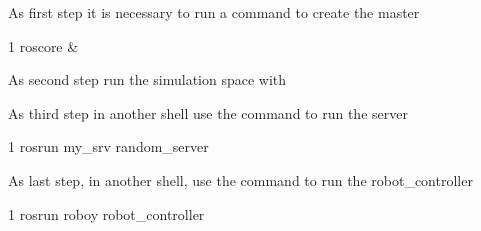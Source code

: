 \begin{DoxyItemize}
\item As first step it is necessary to run a command to create the master 
\begin{DoxyCode}
1 roscore & 
\end{DoxyCode}

\item As second step run the simulation space with 

\item As third step in another shell use the command to run the server 
\begin{DoxyCode}
1 rosrun my\_srv random\_server
\end{DoxyCode}

\item As last step, in another shell, use the command to run the robot\+\_\+controller 
\begin{DoxyCode}
1 rosrun roboy robot\_controller
\end{DoxyCode}
 
\end{DoxyItemize}
